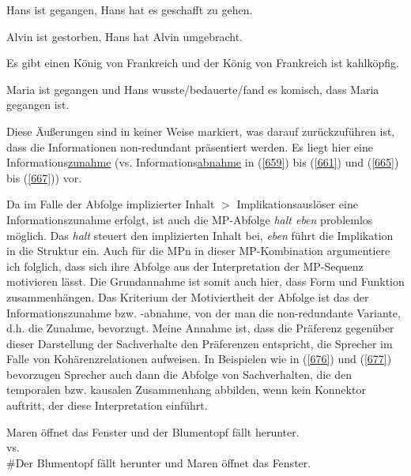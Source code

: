 \begin{exe}
	\ex\label{672} 
	Hans ist gegangen, Hans hat es geschafft zu gehen.
\end{exe}
\vspace{-0.65cm}
\begin{exe}
	\ex\label{673} 
	Alvin ist gestorben, Hans hat Alvin umgebracht.
\end{exe}
\vspace{-0.65cm}	
\begin{exe}
	\ex\label{674} 
	Es gibt einen König von Frankreich und der König von Frankreich ist kahlköpfig.
\end{exe}
\vspace{-0.65cm}
\begin{exe}
	\ex\label{675} 
	Maria ist gegangen und Hans wusste/bedauerte/fand es komisch, dass Maria gegangen ist.
\end{exe}
Diese Äußerungen sind in keiner Weise markiert, was darauf zurückzuführen ist, dass die Informationen non-redundant präsentiert werden. Es liegt hier eine Informations\underline{zunahme} (vs. Informations\underline{abnahme}  in (\ref{659}) bis (\ref{661}) und (\ref{665}) bis (\ref{667})) vor.

Da im Falle der Abfolge implizierter Inhalt $>$ Implikationsauslöser eine Informationszunahme erfolgt, ist auch die MP-Abfolge \textit{halt eben} problemlos möglich. Das \textit{halt} steuert den implizierten Inhalt bei, \textit{eben} führt die Implikation in die Struktur ein. Auch für die MPn in dieser MP-Kombination argumentiere ich folg\-lich, dass sich ihre Abfolge aus der Interpretation der MP-Sequenz motivieren lässt. Die Grundannahme ist somit auch hier, dass Form und Funktion zusammenhängen. Das Kriterium der Motiviertheit der Abfolge ist das der Informati\-onszunahme bzw. -abnahme, von der man die non-redundante Variante, d.h. die Zunahme, bevorzugt. Meine Annahme ist, dass die Präferenz gegenüber dieser Darstellung der Sachverhalte den Präferenzen entspricht, die Sprecher im Falle von Kohärenzrelationen  aufweisen. In Beispielen wie in (\ref{676}) und (\ref{677}) bevorzugen Sprecher auch dann die Abfolge von Sachverhalten, die den temporalen bzw. kausalen Zusammenhang abbilden, wenn kein Konnektor auftritt, der diese Interpretation einführt.

\begin{exe}
	\ex\label{676} 
	Maren öffnet das Fenster und der Blumentopf fällt herunter.\\
	vs.\\
	\#Der Blumentopf fällt herunter und Maren öffnet das Fenster.
\end{exe}

